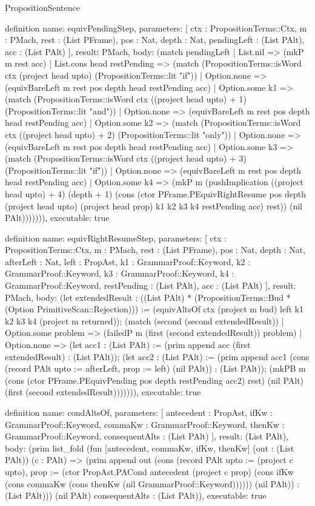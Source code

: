 \begin{lexlean}{PropositionSentence}
\begin{semanticmodule}
definition{
  name: equivPendingStep,
  parameters: [
    ctx : PropositionTerms::Ctx,
    m : PMach,
    rest : (List PFrame),
    pos : Nat,
    depth : Nat,
    pendingLeft : (List PAlt),
    acc : (List PAlt)
  ],
  result: PMach,
  body: (match pendingLeft
    | List.nil => (mkP m rest acc)
    | List.cons head restPending => (match (PropositionTerms::isWord ctx (project head upto) (PropositionTerms::lit "if"))
        | Option.none => (equivBareLeft m rest pos depth head restPending acc)
        | Option.some k1 => (match (PropositionTerms::isWord ctx ((project head upto) + 1) (PropositionTerms::lit "and"))
            | Option.none => (equivBareLeft m rest pos depth head restPending acc)
            | Option.some k2 => (match (PropositionTerms::isWord ctx ((project head upto) + 2) (PropositionTerms::lit "only"))
                | Option.none => (equivBareLeft m rest pos depth head restPending acc)
                | Option.some k3 => (match (PropositionTerms::isWord ctx ((project head upto) + 3) (PropositionTerms::lit "if"))
                    | Option.none => (equivBareLeft m rest pos depth head restPending acc)
                    | Option.some k4 => (mkP m (pushImplication ((project head upto) + 4) (depth + 1) (cons (ctor PFrame.PEquivRightResume pos depth (project head upto) (project head prop) k1 k2 k3 k4 restPending acc) rest)) (nil PAlt))))))),
  executable: true
}

definition{
  name: equivRightResumeStep,
  parameters: [
    ctx : PropositionTerms::Ctx,
    m : PMach,
    rest : (List PFrame),
    pos : Nat,
    depth : Nat,
    afterLeft : Nat,
    left : PropAst,
    k1 : GrammarProof::Keyword,
    k2 : GrammarProof::Keyword,
    k3 : GrammarProof::Keyword,
    k4 : GrammarProof::Keyword,
    restPending : (List PAlt),
    acc : (List PAlt)
  ],
  result: PMach,
  body: (let extendedResult : ((List PAlt) * (PropositionTerms::Bud * (Option PrimitiveScan::Rejection))) := (equivAltsOf ctx (project m bud) left k1 k2 k3 k4 (project m returned)); (match (second (second extendedResult))
    | Option.some problem => (failedP m (first (second extendedResult)) problem)
    | Option.none => (let acc1 : (List PAlt) := (prim append acc (first extendedResult) : (List PAlt)); (let acc2 : (List PAlt) := (prim append acc1 (cons (record PAlt {upto := afterLeft, prop := left}) (nil PAlt)) : (List PAlt)); (mkPB m (cons (ctor PFrame.PEquivPending pos depth restPending acc2) rest) (nil PAlt) (first (second extendedResult))))))),
  executable: true
}

definition{
  name: condAltsOf,
  parameters: [
    antecedent : PropAst,
    ifKw : GrammarProof::Keyword,
    commaKw : GrammarProof::Keyword,
    thenKw : GrammarProof::Keyword,
    consequentAlts : (List PAlt)
  ],
  result: (List PAlt),
  body: (prim list_fold (fun [antecedent, commaKw, ifKw, thenKw] (out : (List PAlt)) (c : PAlt) => (prim append out (cons (record PAlt {upto := (project c upto), prop := (ctor PropAst.PACond antecedent (project c prop) (cons ifKw (cons commaKw (cons thenKw (nil GrammarProof::Keyword)))))}) (nil PAlt)) : (List PAlt))) (nil PAlt) consequentAlts : (List PAlt)),
  executable: true
}


\end{semanticmodule}
\end{lexlean}
